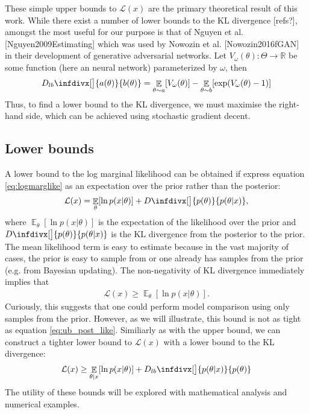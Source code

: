 \documentclass{article}
\DeclareMathOperator{\Ex}{\mathbb{E}}%
\newcommand{\infdiv}{D\infdivx}
\newcommand{\infdivlb}{D_{lb}\infdivx}
\begin{document}
These simple upper bounds to $\mathcal{L}(x)$ are the primary theoretical result of this work. While there exist a number of lower bounds to the KL divergence [refs?], amongst the most useful for our purpose is that of Nguyen et al.  [Nguyen2009Estimating] which was used by Nowozin et al. [Nowozin2016fGAN] in their development of generative adversarial networks. Let  $V_\omega(\theta):\Theta \rightarrow \mathbb{R}$ be some function (here an neural network) parameterized by $\omega$, then 
\begin{align}
   \infdivlb[\big]{a(\theta)}{b(\theta)} = \Ex_{\theta \sim a}[V_\omega(\theta)] - \Ex_{\theta \sim b} [\exp(V_\omega(\theta) - 1) ]
\end{align}
Thus, to find a lower bound to the KL divergence, we must maximise the right-hand side, which can be achieved using stochastic gradient decent.

\subsection{Lower bounds}
A lower bound to the log marginal likelihood can be obtained if express equation \ref{eq:logmarglike} as an expectation over the prior rather than the posterior:
\begin{align}
\mathcal{L}(x) &= \Ex_{\theta} [ \ln  p(x|\theta)] + \infdiv[\big]{p(\theta)}{ p(\theta|x)}, \notag\\
\end{align}
where $\Ex_{\theta} [ \ln  p(x|\theta)]$ is the expectation of the likelihood over the prior and $\infdiv[\big]{p(\theta)}{ p(\theta|x)}$ is the KL divergence from the posterior to the prior. The mean likelihood term is easy to estimate because in the vast majority of cases, the prior is easy to sample from or one already has samples from the prior (e.g. from Bayesian updating). The non-negativity of KL divergence immediately implies that
\begin{align}
\mathcal{L}(x) \geq \Ex_{\theta } [ \ln  p(x|\theta)]. 
\label{eq:lb_prior_like}
\end{align}
Curiously, this suggests that one could perform model comparison using only samples from the prior. However, as we will illustrate, this bound is not as tight as equation \ref{eq:ub_post_like}. Similiarly as with the upper bound, we can construct a tighter lower bound to $\mathcal{L}(x)$ with a lower bound to the KL divergence:
\begin{align}
\mathcal{L}(x) \geq \Ex_{\theta | x} [ \ln  p(x|\theta)] + \infdivlb[\big]{p(\theta | x)}{p(\theta)}
\end{align}
The utility of these bounds will be explored with mathematical analysis and numerical examples.
\end{document}
